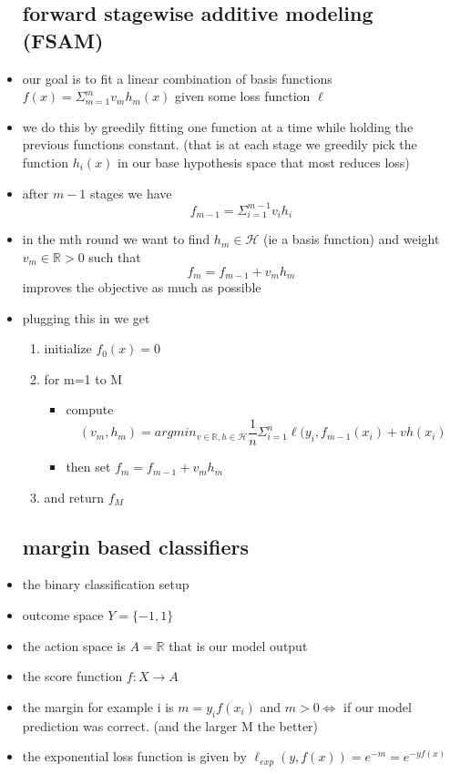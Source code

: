 \documentclass{article}
\begin{document}
\begin{itemize}
\subsection{forward stagewise additive modeling  (FSAM)}
\item our goal is to fit a linear combination of basis functions $f(x)=\Sigma_{m=1}^{m}v_mh_m(x)$ given some loss function $\ell$
\item we do this by greedily fitting one function at a time while holding the previous functions constant. (that is at each stage we greedily pick the function $h_i(x)$ in our base hypothesis space that most reduces loss)
\item after $m-1$ stages we have $$f_{m-1}=\Sigma_{i=1}^{m-1}v_ih_i$$
\item in the mth round we want to find $h_m\in \mathcal{H}$ (ie a basis function) and weight $v_m\in \mathbb{R}>0$ such that $$f_m=f_{m-1}+v_mh_m$$ improves the objective as much as possible 
\item plugging this in we get 
\begin{enumerate}
    \item initialize $f_0(x)=0$
    \item for m=1 to M
    \begin{itemize}
        \item compute $$(v_m,h_m)=argmin_{v\in \mathbb{R}, h\in \mathcal{H}}\frac{1}{n}\Sigma_{i=1}^{n}\ell(y_i,f_{m-1}(x_i)+vh(x_i)$$
        \item then set $f_{m}=f_{m-1}+v_mh_m$
    \end{itemize}
    \item and return $f_M$
\end{enumerate}
\subsection{margin based classifiers}
\item the binary classification setup
\item outcome space $Y=\{-1,1\}$
\item the action space is $A=\mathbb{R}$ that is our model output
\item the score function $f:X\rightarrow A$
\item the margin for example i is $m=y_if(x_i)$ and $m>0\iff $ if our model prediction was correct. (and the larger M the better) 
\item the exponential loss function is given by $\ell_{exp}(y,f(x))=e^{-m}=e^{-yf(x)}$

\end{itemize}
\end{document}
